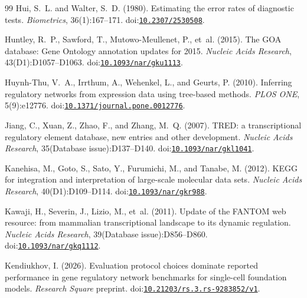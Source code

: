 \documentclass[11pt,a4paper]{article}
\begin{document}
\begin{thebibliography}{99}
Hui, S.~L. and Walter, S.~D. (1980).
\newblock Estimating the error rates of diagnostic tests.
\newblock \emph{Biometrics}, 36(1):167--171.
\newblock doi:\href{https://doi.org/10.2307/2530508}{\nolinkurl{10.2307/2530508}}.

Huntley, R.~P., Sawford, T., Mutowo-Meullenet, P., et~al. (2015).
\newblock The GOA database: Gene Ontology annotation updates for 2015.
\newblock \emph{Nucleic Acids Research}, 43(D1):D1057--D1063.
\newblock doi:\href{https://doi.org/10.1093/nar/gku1113}{\nolinkurl{10.1093/nar/gku1113}}.

Huynh-Thu, V.~A., Irrthum, A., Wehenkel, L., and Geurts, P. (2010).
\newblock Inferring regulatory networks from expression data using tree-based methods.
\newblock \emph{PLOS ONE}, 5(9):e12776.
\newblock doi:\href{https://doi.org/10.1371/journal.pone.0012776}{\nolinkurl{10.1371/journal.pone.0012776}}.

Jiang, C., Xuan, Z., Zhao, F., and Zhang, M.~Q. (2007).
\newblock TRED: a transcriptional regulatory element database, new entries and other development.
\newblock \emph{Nucleic Acids Research}, 35(Database issue):D137--D140.
\newblock doi:\href{https://doi.org/10.1093/nar/gkl1041}{\nolinkurl{10.1093/nar/gkl1041}}.

Kanehisa, M., Goto, S., Sato, Y., Furumichi, M., and Tanabe, M. (2012).
\newblock KEGG for integration and interpretation of large-scale molecular data sets.
\newblock \emph{Nucleic Acids Research}, 40(D1):D109--D114.
\newblock doi:\href{https://doi.org/10.1093/nar/gkr988}{\nolinkurl{10.1093/nar/gkr988}}.

Kawaji, H., Severin, J., Lizio, M., et~al. (2011).
\newblock Update of the FANTOM web resource: from mammalian transcriptional landscape to its dynamic regulation.
\newblock \emph{Nucleic Acids Research}, 39(Database issue):D856--D860.
\newblock doi:\href{https://doi.org/10.1093/nar/gkq1112}{\nolinkurl{10.1093/nar/gkq1112}}.

Kendiukhov, I. (2026).
\newblock Evaluation protocol choices dominate reported performance in gene regulatory network benchmarks for single-cell foundation models.
\newblock \emph{Research Square} preprint.
\newblock doi:\href{https://doi.org/10.21203/rs.3.rs-9283852/v1}{\nolinkurl{10.21203/rs.3.rs-9283852/v1}}.


\end{thebibliography}
\end{document}
